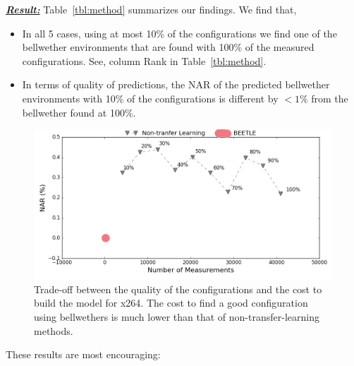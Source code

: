 \documentclass[10pt,journal,compsoc]{IEEEtran}
\begin{document}

\noindent\textbf{\textit{\underline{Result:}}}
Table~\ref{tbl:method} summarizes our findings. We find that, 
\begin{itemize}[leftmargin=*]
    \item In all 5 cases, using at most 10\% of the configurations we find one of the bellwether environments that are found with 100\% of the measured configurations. See, column Rank in Table~\ref{tbl:method}. 
    \item In terms of quality of predictions, the NAR of the predicted bellwether environments with 10\% of the configurations is different by $<1\%$ from the bellwether found at 100\%.
\end{itemize}

 \begin{figure}[!t]
    \centering
    \includegraphics[width=1.04\linewidth]{figures/x264.png}
    \caption{{\small Trade-off between the quality of the configurations and the cost to build the model for {\sc x264}. The cost to find a good configuration using bellwethers is much lower than that of non-transfer-learning methods. }}
    \label{fig:tradeoffx264}
\end{figure}
These  results are most encouraging:
\end{document}
